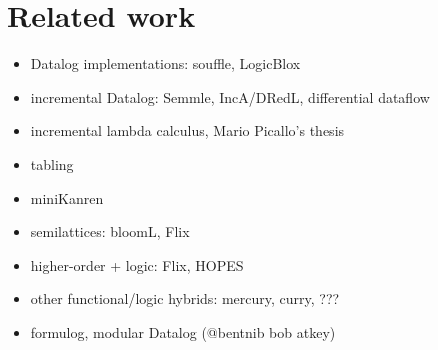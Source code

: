 \chapter{Related work}
\XXX

\begin{itemize}[nosep]
\item Datalog implementations: souffle, LogicBlox
\item incremental Datalog:  Semmle, IncA/DRedL, differential dataflow
\item incremental lambda calculus, Mario Picallo's thesis
\item tabling
\item miniKanren
\item semilattices: bloomL, Flix
\item higher-order + logic: Flix, HOPES
\item other functional/logic hybrids: mercury, curry, ???
\item formulog, modular Datalog (@bentnib bob atkey)
\end{itemize}
